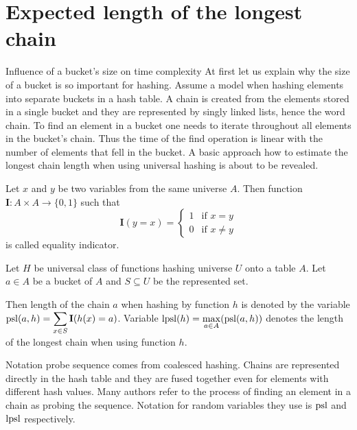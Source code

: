 \chapter{Expected length of the longest chain}

\begin{section}{Influence of a bucket's size on time complexity}
At first let us explain why the size of a bucket is so important for hashing. Assume a model when hashing elements into separate buckets in a hash table. A chain is created from the elements stored in a single bucket and they are represented by singly linked lists, hence the word chain. To find an element in a bucket one needs to iterate throughout all elements in the bucket's chain. Thus the time of the find operation is linear with the number of elements that fell in the bucket. A basic approach how to estimate the longest chain length when using universal hashing is about to be revealed.

\begin{definition}
Let $x$ and $y$ be two variables from the same universe $A$. Then function $\mathbf{I}: A \times A \rightarrow \{0, 1\}$ such that
\[
 \mathbf{I}(y = x) =
  \begin{cases}
   1 & \text{if } x = y \\
   0 & \text{if } x \neq y
  \end{cases}
\]
is called equality indicator.
\end{definition}

\begin{definition}
Let $H$ be universal class of functions hashing universe $U$ onto a table $A$. Let $a \in A$ be a bucket of $A$ and $S \subseteq U$ be the represented set. 

Then length of the chain $a$ when hashing by function $h$ is denoted by the variable $\mathrm{psl}(a, h) = \displaystyle \sum_{x \in S} \mathbf{I}(h(x) = a)$. Variable $\mathrm{lpsl}(h) = \displaystyle \max_{a \in A} (\mathrm{psl}(a, h))$ denotes the length of the longest chain when using function $h$.
\end{definition}

Notation probe sequence comes from coalesced hashing. Chains are represented directly in the hash table and they are fused together even for elements with different hash values. Many authors refer to the process of finding an element in a chain as probing the sequence. Notation for random variables they use is $\mathrm{psl}$ and $\mathrm{lpsl}$ respectively. %


\end{section}
